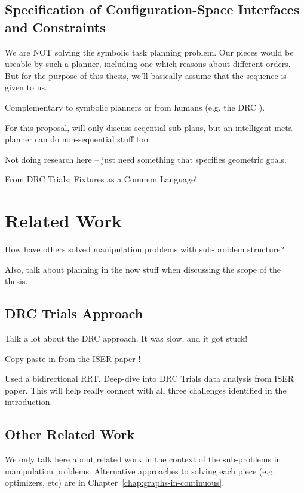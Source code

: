 \subsection{Specification of Configuration-Space Interfaces
   and Constraints}

We are NOT solving the symbolic task planning problem.
Our pieces would be useable by such a planner,
including one which reasons about different orders.
But for the purpose of this thesis,
we'll basically assume that the sequence is given to us.

Complementary to symbolic planners
or from humans (e.g. the DRC \cite{dellin2014drc}).

For this proposal,
will only discuss seqential sub-plans,
but an intelligent meta-planner
can do non-sequential stuff too.

Not doing research here -- just need something that specifies
geometric goals.

From DRC Trials: Fixtures as a Common Language!

\section{Related Work}
\label{sec:subprobs:related}

How have others solved manipulation problems with sub-problem
structure?

Also, talk about planning in the now stuff
when discussing the scope of the thesis.

\subsection{DRC Trials Approach}

Talk a lot about the DRC approach.
It was slow, and it got stuck!

Copy-paste in from the ISER paper \cite{dellin2014drc}!

Used a bidirectional RRT.
Deep-dive into DRC Trials data analysis from ISER paper.
This will help really connect with all three challenges
identified in the introduction.

\subsection{Other Related Work}

We only talk here about related work
in the context of the sub-problems in manipulation problems.
Alternative approaches to solving each piece
(e.g. optimizers, etc)
are in Chapter~\ref{chap:graphs-in-continuous}.

